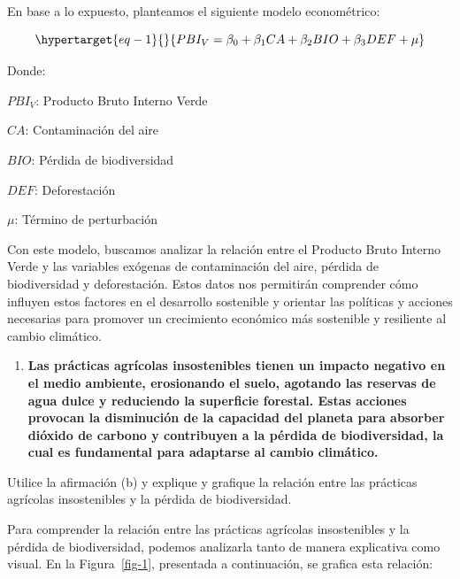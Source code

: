\documentclass[
  a4paper,
]{article}
\providecommand{\tightlist}{%
  \setlength{\itemsep}{0pt}\setlength{\parskip}{0pt}}\usepackage{longtable,booktabs,array}
\begin{document}
En base a lo expuesto, planteamos el siguiente modelo econométrico:

\begin{equation}\protect\hypertarget{eq-1}{}{
PBI_{V} = \beta_{0} + \beta_{1}CA + \beta_{2}BIO + \beta_{3}DEF + \mu
}\label{eq-1}\end{equation}

Donde:

\(PBI_{V}\): Producto Bruto Interno Verde

\(CA\): Contaminación del aire

\(BIO\): Pérdida de biodiversidad

\(DEF\): Deforestación

\(\mu\): Término de perturbación

Con este modelo, buscamos analizar la relación entre el Producto Bruto
Interno Verde y las variables exógenas de contaminación del aire,
pérdida de biodiversidad y deforestación. Estos datos nos permitirán
comprender cómo influyen estos factores en el desarrollo sostenible y
orientar las políticas y acciones necesarias para promover un
crecimiento económico más sostenible y resiliente al cambio climático.

\begin{enumerate}
\def\labelenumi{\alph{enumi}.}
\setcounter{enumi}{1}
\tightlist
\item
  \textbf{Las prácticas agrícolas insostenibles tienen un impacto
  negativo en el medio ambiente, erosionando el suelo, agotando las
  reservas de agua dulce y reduciendo la superficie forestal. Estas
  acciones provocan la disminución de la capacidad del planeta para
  absorber dióxido de carbono y contribuyen a la pérdida de
  biodiversidad, la cual es fundamental para adaptarse al cambio
  climático.}
\end{enumerate}

Utilice la afirmación (b) y explique y grafique la relación entre las
prácticas agrícolas insostenibles y la pérdida de biodiversidad.

Para comprender la relación entre las prácticas agrícolas insostenibles
y la pérdida de biodiversidad, podemos analizarla tanto de manera
explicativa como visual. En la Figura~\ref{fig-1}, presentada a
continuación, se grafica esta relación:
\end{document}
